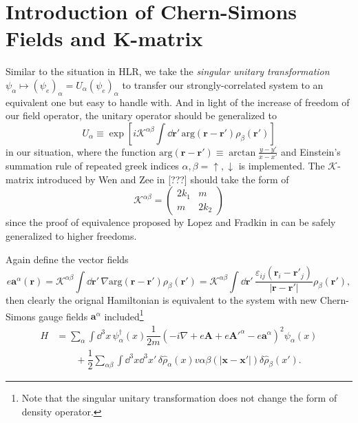 \documentclass[bachelor,english,numbers]{ustcthesis}
\begin{document}
	\section{Introduction of Chern-Simons Fields and K-matrix}
		\indent\par Similar to the situation in HLR, we take the \emph{singular unitary transformation} $\psi_\alpha\mapsto(\psi_e)_\alpha=U_\alpha(\psi_e)_\alpha$ to transfer our strongly-correlated system to an equivalent one but easy to handle with. And in light of the increase of freedom of our field operator, the unitary operator should be generalized to 
		\begin{equation}\label{2.2.1}
			U_\alpha\equiv\exp \left[i\mathcal{K}^{\alpha \beta}\int\dd\bm{r'}\,\mathrm{arg}(\bm{r}-\bm{r'})\rho_\beta(\bm{r'}) \right]
		\end{equation}
		in our situation, where the function $\mathrm{arg}(\bm{r}-\bm{r'})\equiv\arctan\frac{y-y'}{x-x'}$ and Einstein's summation rule of repeated greek indices $\alpha,\beta=\uparrow,\downarrow$ is implemented. The $\mathcal{K}$-matrix introduced by Wen and Zee in [???] should take the form of \cite{mandal1996theory}
		\begin{equation}\label{2.2.2}
			\mathcal{K}^{\alpha \beta}=\left(\begin{array}{cc}
				2k_1 & m \\ m & 2k_2
			\end{array}\right) 
		\end{equation}
		since the proof of equivalence proposed by Lopez and Fradkin in \cite{lopez1991fractional} can be safely generalized to higher freedoms.\par
		Again define the vector fields
		\begin{equation}\label{2.2.3}
			e\bm{a}^\alpha(\bm{r})=\mathcal{K}^{\alpha \beta}\int\dd\bm{r'}\,\nabla\mathrm{arg}(\bm{r}-\bm{r'})\rho_\beta(\bm{r'})=\mathcal{K}^{\alpha\beta}\int\dd\bm{r'}\,\dfrac{\varepsilon_{ij}(\bm{r}_i-\bm{r'}_j)}{|\bm{r}-\bm{r'}|}\rho_\beta(\bm{r'}),
		\end{equation}
		then clearly the orignal Hamiltonian is equivalent to the system with new Chern-Simons gauge fields $\bm{a}^\alpha$ included\footnote{Note that the singular unitary transformation does not change the form of density operator.}
		\begin{align}\label{2.2.4}
			H&=\sum_\alpha\int\dd^3x\,\psi^\dagger_\alpha(x)\dfrac{1}{2m}\left(-i\nabla+e\bm{A}+e\bm{A'}^\alpha-e\bm{a}^\alpha\right)^2\psi_\alpha(x)\nonumber\\
			&\qquad+\dfrac{1}{2}\sum_{\alpha \beta}\int\dd^3x\dd^3x'\,\delta\hat{\rho}_\alpha(x)v{\alpha \beta}(|\bm{x}-\bm{x'}|)\delta\hat{\rho}_\beta(x').
		\end{align}
\end{document}
